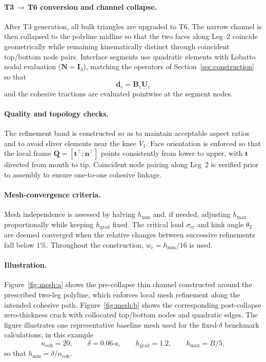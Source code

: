 \documentclass[smallextended]{svjour3}       %
\newcommand{\vb}[1]{\bm{#1}}      %
\newcommand{\mat}[1]{\mathbf{#1}}  %
\newcommand{\tvec}{\vb{t}}
\newcommand{\nvec}{\vb{n}}
\newcommand{\QQ}{\mat{Q}}          %
\providecommand{\bt}{\tvec}
\renewcommand{\bt}{\tvec}
\providecommand{\bn}{\nvec}
\renewcommand{\bn}{\nvec}
\providecommand{\bd}{\vb d}
\renewcommand{\bd}{\vb d}
\begin{document}
\paragraph{T3\,$\to$\,T6 conversion and channel collapse.}
After T3 generation, all bulk triangles are upgraded to T6. The narrow
channel is then collapsed to the polyline midline so that the two faces
along Leg~2 coincide geometrically while remaining kinematically distinct
through coincident top/bottom node pairs. Interface segments use quadratic
elements with Lobatto nodal evaluation (\(\mat N=\mat I_3\)), matching the
operators of Section~\ref{sec:construction} so that
\[
\bd_e=\mat B_e\vb U_e
\]
and the cohesive tractions are evaluated pointwise at the segment nodes.

\paragraph{Quality and topology checks.}
The refinement band is constructed so as to maintain acceptable aspect
ratios and to avoid sliver elements near the knee \(V_1\). Face orientation
is enforced so that the local frame
\(\QQ=[\bt^\top;\bn^\top]\) points consistently from lower to upper, with
\(\bt\) directed from mouth to tip. Coincident node pairing along Leg~2 is
verified prior to assembly to ensure one-to-one cohesive linkage.

\paragraph{Mesh-convergence criteria.}
Mesh independence is assessed by halving \(h_{\min}\) and, if needed,
adjusting \(h_{\max}\) proportionally while keeping \(h_{\mathrm{grad}}\)
fixed. The critical load \(\sigma_{\mathrm{cr}}\) and kink angle \(\theta_2\)
are deemed converged when the relative changes between successive
refinements fall below \(1\%\). Throughout the construction,
\(w_c=h_{\min}/16\) is used.

\paragraph{Illustration.}
Figure~\ref{fig:mesh:a} shows the pre-collapse thin channel constructed
around the prescribed two-leg polyline, which enforces local mesh
refinement along the intended cohesive path. Figure~\ref{fig:mesh:b} shows
the corresponding post-collapse zero-thickness crack with collocated
top/bottom nodes and quadratic edges. The figure illustrates one
representative baseline mesh used for the fixed-\(\delta\) benchmark
calculations; in this example
\[
n_{\mathrm{coh}}=20,
\qquad
\delta=0.06\,a,
\qquad
h_{\mathrm{grad}}=1.2,
\qquad
h_{\max}=B/5,
\]
so that \(h_{\min}=\delta/n_{\mathrm{coh}}\).
\end{document}

